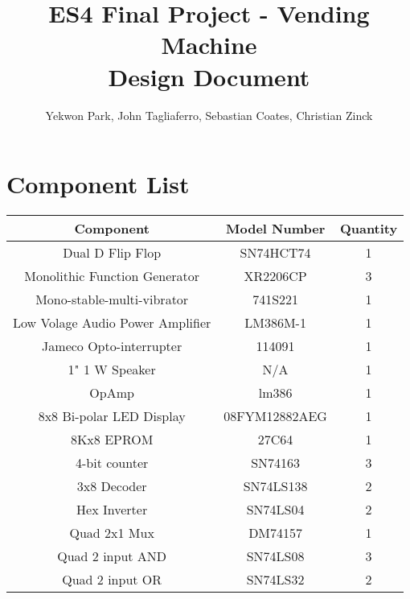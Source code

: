 \documentclass{article}
\title{\textbf{ES4 Final Project - Vending Machine \\ Design Document}}
\author{Yekwon Park, John Tagliaferro, Sebastian Coates, Christian Zinck}
\begin{document}
 
\maketitle{} 
\setlength{\parindent}{0pt}


\clearpage

\section*{Component List}
\begin{center}
 \begin{tabular}{|c | c | c |} 
 \hline
 Component & Model Number & Quantity \\ [0.5ex] 
 \hline\hline
 Dual D Flip Flop & SN74HCT74 & 1\\ 
 \hline
 Monolithic Function Generator & XR2206CP & 3\\
 \hline
 Mono-stable-multi-vibrator & 741S221 & 1\\
 \hline
 Low Volage Audio Power Amplifier & LM386M-1 & 1\\
 \hline
 Jameco Opto-interrupter & 114091 & 1\\
 \hline
 1" 1 W Speaker & N/A & 1\\ 
 \hline
 OpAmp & lm386 & 1\\
 \hline
 8x8 Bi-polar LED Display & 08FYM12882AEG  & 1\\
 \hline
 8Kx8 EPROM & 27C64 & 1 \\
 \hline
 4-bit counter & SN74163 & 3\\
 \hline
 3x8 Decoder & SN74LS138 & 2\\
 \hline
 Hex Inverter & SN74LS04 & 2\\
 \hline
 Quad 2x1 Mux & DM74157 & 1\\
 \hline
 Quad 2 input AND & SN74LS08 & 3\\
 \hline
 Quad 2 input OR & SN74LS32 & 2\\
 \hline

\end{tabular}
\end{center}
\end{document}
